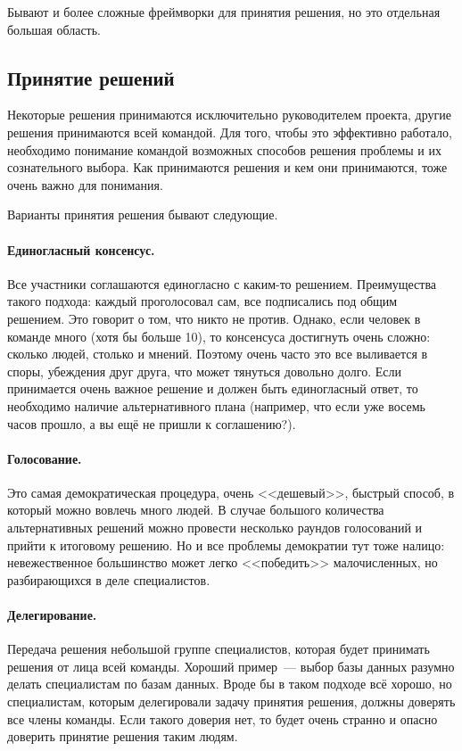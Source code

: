 \documentclass{../../text-style}
\begin{document}
Бывают и более сложные фреймворки для принятия решения, но это отдельная большая область.

\subsection{Принятие решений}

Некоторые решения принимаются исключительно руководителем проекта, другие решения принимаются всей командой. Для того, чтобы это эффективно работало, необходимо понимание командой возможных способов решения проблемы и их сознательного выбора. Как принимаются решения и кем они принимаются, тоже очень важно для понимания.

Варианты принятия решения бывают следующие.

\paragraph*{Единогласный консенсус.} Все участники соглашаются единогласно с каким-то решением. Преимущества такого подхода: каждый проголосовал сам, все подписались под общим решением. Это говорит о том, что никто не против. Однако, если человек в команде много (хотя бы больше 10), то консенсуса достигнуть очень сложно: сколько людей, столько и мнений. Поэтому очень часто это все выливается в споры, убеждения друг друга, что может тянуться довольно долго. Если принимается очень важное решение и должен быть единогласный ответ, то необходимо наличие альтернативного плана (например, что если уже восемь часов прошло, а вы ещё не пришли к соглашению?).

\paragraph*{Голосование.} Это самая демократическая процедура, очень <<дешевый>>, быстрый способ, в который можно вовлечь много людей. В случае большого количества альтернативных решений можно провести несколько раундов голосований и прийти к итоговому решению. Но и все проблемы демократии тут тоже налицо: невежественное большинство может легко <<победить>> малочисленных, но разбирающихся в деле специалистов.

\paragraph*{Делегирование.} Передача решения небольшой группе специалистов, которая будет принимать решения от лица всей команды. Хороший пример~--- выбор базы данных разумно делать специалистам по базам данных. Вроде бы в таком подходе всё хорошо, но специалистам, которым делегировали задачу принятия решения, должны доверять все члены команды. Если такого доверия нет, то будет очень странно и опасно доверить принятие решения таким людям.
\end{document}
